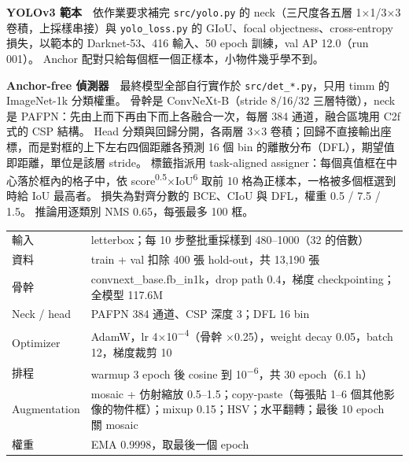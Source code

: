\documentclass[10pt,a4paper]{article}
\renewcommand{\small}{\fontsize{9.5pt}{15pt}\selectfont}
\newcommand{\baselineval}{12.0}   %
\newcommand{\bestparams}{117.6M}  %
\newcommand{\besttime}{6.1 h}     %
\begin{document}
\begin{minipage}[t]{0.50\linewidth}
\raggedright\setlength{\parskip}{5pt}
\textbf{YOLOv3 範本}　依作業要求補完 \texttt{src/yolo.py} 的 neck（三尺度各五層 1×1/3×3 卷積，上採樣串接）與 \texttt{yolo\_loss.py} 的 GIoU、focal objectness、cross-entropy 損失，以範本的 Darknet-53、416 輸入、50 epoch 訓練，val AP \baselineval（run 001）。
Anchor 配對只給每個框一個正樣本，小物件幾乎學不到。

\textbf{Anchor-free 偵測器}　最終模型全部自行實作於 \texttt{src/det\_*.py}，只用 timm 的 ImageNet-1k 分類權重。
骨幹是 ConvNeXt-B（stride 8/16/32 三層特徵），neck 是 PAFPN：先由上而下再由下而上各融合一次，每層 384 通道，融合區塊用 C2f 式的 CSP 結構。
Head 分類與回歸分開，各兩層 3×3 卷積；回歸不直接輸出座標，而是對框的上下左右四個距離各預測 16 個 bin 的離散分布（DFL），期望值即距離，單位是該層 stride。
標籤指派用 task-aligned assigner：每個真值框在中心落於框內的格子中，依 score\textsuperscript{0.5}×IoU\textsuperscript{6} 取前 10 格為正樣本，一格被多個框選到時給 IoU 最高者。
損失為對齊分數的 BCE、CIoU 與 DFL，權重 0.5 / 7.5 / 1.5。
推論用逐類別 NMS 0.65，每張最多 100 框。
\end{minipage}\hfill
\begin{minipage}[t]{0.46\linewidth}
\vspace{-6pt}
\label{tab:cfg}
\small
\begin{tabularx}{\linewidth}{@{}>{\color{muted}}l >{\raggedright\arraybackslash}X@{}}
\toprule
輸入 & 800 letterbox；每 10 步整批重採樣到 480–1000（32 的倍數） \\
資料 & train + val 扣除 400 張 hold-out，共 13,190 張 \\
骨幹 & convnext\_base.fb\_in1k，drop path 0.4，梯度 checkpointing；全模型 \bestparams \\
Neck / head & PAFPN 384 通道、CSP 深度 3；DFL 16 bin \\
Optimizer & AdamW，lr 4×10\textsuperscript{−4}（骨幹 ×0.25），weight decay 0.05，batch 12，梯度裁剪 10 \\
排程 & warmup 3 epoch 後 cosine 到 10\textsuperscript{−6}，共 30 epoch（\besttime） \\
Augmentation & mosaic + 仿射縮放 0.5–1.5；copy-paste（每張貼 1–6 個其他影像的物件框）；mixup 0.15；HSV；水平翻轉；最後 10 epoch 關 mosaic \\
權重 & EMA 0.9998，取最後一個 epoch \\
\bottomrule
\end{tabularx}
\end{minipage}
\end{document}
